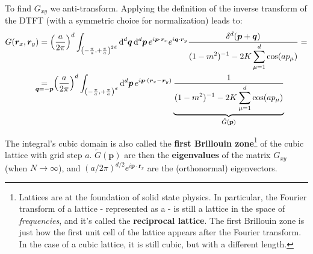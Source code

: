 \documentclass[../../main.tex]{subfiles}
\begin{document}
To find $G_{xy}$ we anti-transform. Applying the definition of the inverse transform of the DTFT (with a symmetric choice for normalization) leads to:
\begin{align}\nonumber
    G(\bm{r}_x, \bm{r}_y) &= \left(\frac{a}{2\pi} \right)^{d} \int_{\left(-\frac{\pi}{a}, +\frac{\pi}{a} \right)^{2d}} \dd[d]{\bm{q}}  \dd[d]{\bm{p}} 
    e^{i \bm{p} \cdot \bm{r}_x} e^{i \bm{q} \cdot \bm{r}_y}
    \frac{ \delta^d(\bm{p}+ \bm{q})}{\displaystyle (1-m^2)^{-1} - 2K \sum_{\mu=1}^d \cos(a p_\mu)}  =\\
    &\underset{\mathclap{\bm{q} = -\bm{p}}}{=}\>\> \left(\frac{a}{2\pi} \right)^{d} \int_{\left(-\frac{\pi}{a},+\frac{\pi}{a}  \right)^d} \dd[d]{\bm{p}} e^{i \bm{p} \cdot (\bm{r}_x - \bm{r}_y)} \underbrace{\frac{1}{\displaystyle (1-m^2)^{-1} - 2K \sum_{\mu=1}^d \cos(a p_\mu)}}_{\tilde{G}(\bm{p})} \label{eqn:G-eigenvalue}
\end{align}


The integral's cubic domain is also called the \textbf{first Brillouin zone}\footnote{Lattices are at the foundation of solid state physics. In particular, the Fourier transform of a lattice - represented as a  - is still a lattice in the space of \textit{frequencies}, and it's called the \textbf{reciprocal lattice}. The first Brillouin zone is just how the first unit cell of the lattice appears after the Fourier transform. In the case of a cubic lattice, it is still cubic, but with a different length.} of the cubic lattice with grid step $a$. $\tilde{G}(\bm{p})$ are then the \textbf{eigenvalues} of the matrix $G_{xy}$ (when $N \to \infty$), and $(a/2\pi)^{d/2} e^{i \bm{p}\cdot \bm{r}_x}$ are the (orthonormal) eigenvectors.
\begin{comment}
    In the sense that:
    \begin{align*}
        \sum_y G_{xy}^{-1} e^{iq y} = e^{i q x} \left[\frac{1}{1-m^2} - 2K\sum_{\mu=1}^d \cos(q_\mu a) \right] \equiv \frac{e^{iqx}}{\tilde{G}(q)} 
    \end{align*}
\end{comment}
\end{document}
